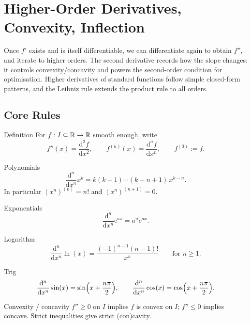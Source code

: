 \chapter{Higher-Order Derivatives, Convexity, Inflection}

Once $f'$ exists and is itself differentiable, we can differentiate again to
obtain $f''$, and iterate to higher orders. The second derivative records
how the slope changes: it controls convexity/concavity and powers the
second-order condition for optimisation. Higher derivatives of standard
functions follow simple closed-form patterns, and the Leibniz rule extends
the product rule to all orders.

\section{Core Rules}

\begin{rulebox}{Definition}
For $f:I\subseteq\mathbb{R}\to\mathbb{R}$ smooth enough, write
\[
  f''(x)=\frac{\mathrm{d}^{2}f}{\mathrm{d}x^{2}},\qquad
  f^{(n)}(x)=\frac{\mathrm{d}^{n}f}{\mathrm{d}x^{n}},\qquad
  f^{(0)}:=f .
\]
\end{rulebox}

\begin{rulebox}{Polynomials}
\[
  \frac{\mathrm{d}^{n}}{\mathrm{d}x^{n}}x^{k}
    =k(k-1)\cdots(k-n+1)\,x^{k-n} .
\]
In particular $(x^{n})^{(n)}=n!$ and $(x^{n})^{(n+1)}=0$.
\end{rulebox}

\begin{rulebox}{Exponentials}
\[
  \frac{\mathrm{d}^{n}}{\mathrm{d}x^{n}}\mathrm{e}^{ax}=a^{n}\mathrm{e}^{ax} .
\]
\end{rulebox}

\begin{rulebox}{Logarithm}
\[
  \frac{\mathrm{d}^{n}}{\mathrm{d}x^{n}}\ln(x)
    =\frac{(-1)^{n-1}(n-1)!}{x^{n}}\qquad\text{for } n\geq 1 .
\]
\end{rulebox}

\begin{rulebox}{Trig}
\[
  \frac{\mathrm{d}^{n}}{\mathrm{d}x^{n}}\sin(x)=\sin\Bigl(x+\frac{n\pi}{2}\Bigr),
  \qquad
  \frac{\mathrm{d}^{n}}{\mathrm{d}x^{n}}\cos(x)=\cos\Bigl(x+\frac{n\pi}{2}\Bigr) .
\]
\end{rulebox}

\begin{rulebox}{Convexity / concavity}
$f''\geq 0$ on $I$ implies $f$ is convex on $I$; $f''\leq 0$ implies
concave. Strict inequalities give strict (con)cavity.
\end{rulebox}

